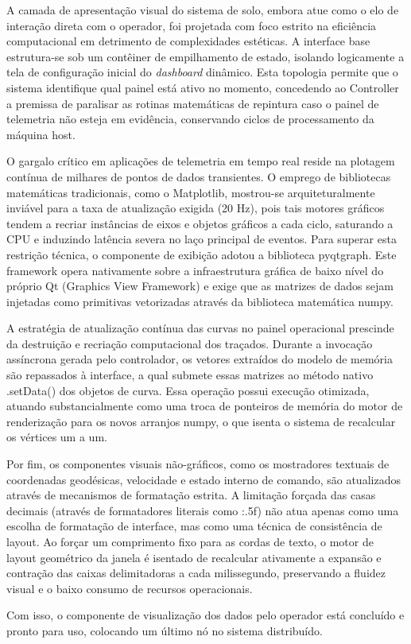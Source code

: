 A camada de apresentação visual do sistema de solo, embora atue como o elo de interação direta com o operador, foi projetada com foco estrito na eficiência computacional em detrimento de complexidades estéticas. A interface base estrutura-se sob um contêiner de empilhamento de estado, isolando logicamente a tela de configuração inicial do \textit{dashboard} dinâmico. Esta topologia permite que o sistema identifique qual painel está ativo no momento, concedendo ao Controller a premissa de paralisar as rotinas matemáticas de repintura caso o painel de telemetria não esteja em evidência, conservando ciclos de processamento da máquina host.

O gargalo crítico em aplicações de telemetria em tempo real reside na plotagem contínua de milhares de pontos de dados transientes. O emprego de bibliotecas matemáticas tradicionais, como o Matplotlib, mostrou-se arquiteturalmente inviável para a taxa de atualização exigida (20 Hz), pois tais motores gráficos tendem a recriar instâncias de eixos e objetos gráficos a cada ciclo, saturando a CPU e induzindo latência severa no laço principal de eventos. Para superar esta restrição técnica, o componente de exibição adotou a biblioteca pyqtgraph. Este framework opera nativamente sobre a infraestrutura gráfica de baixo nível do próprio Qt (Graphics View Framework) e exige que as matrizes de dados sejam injetadas como primitivas vetorizadas através da biblioteca matemática numpy.

A estratégia de atualização contínua das curvas no painel operacional prescinde da destruição e recriação computacional dos traçados. Durante a invocação assíncrona gerada pelo controlador, os vetores extraídos do modelo de memória são repassados à interface, a qual submete essas matrizes ao método nativo .setData() dos objetos de curva. Essa operação possui execução otimizada, atuando substancialmente como uma troca de ponteiros de memória do motor de renderização para os novos arranjos numpy, o que isenta o sistema de recalcular os vértices um a um.

Por fim, os componentes visuais não-gráficos, como os mostradores textuais de coordenadas geodésicas, velocidade e estado interno de comando, são atualizados através de mecanismos de formatação estrita. A limitação forçada das casas decimais (através de formatadores literais como :.5f) não atua apenas como uma escolha de formatação de interface, mas como uma técnica de consistência de layout. Ao forçar um comprimento fixo para as cordas de texto, o motor de layout geométrico da janela é isentado de recalcular ativamente a expansão e contração das caixas delimitadoras a cada milissegundo, preservando a fluidez visual e o baixo consumo de recursos operacionais.

Com isso, o componente de visualização dos dados pelo operador está concluído e pronto para uso, colocando um último nó no sistema distribuído.
